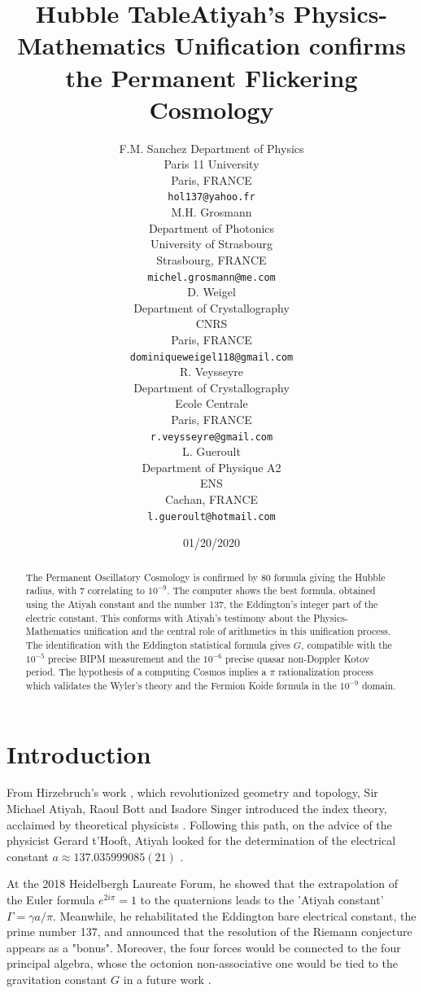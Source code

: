 \documentclass[a4paper,9pt]{article}
\title{Hubble Table}
\date{01/20/2020}
\title{Atiyah's Physics-Mathematics Unification confirms the Permanent Flickering Cosmology}
\author{
  F.M. Sanchez
  Department of Physics\\
  Paris 11 University\\
  Paris, FRANCE \\
  \texttt{hol137@yahoo.fr} \\
   \And
 M.H. Grosmann \\
  Department of Photonics\\
  University of Strasbourg\\
  Strasbourg, FRANCE \\
  \texttt{michel.grosmann@me.com} \\
   \And
 D. Weigel \\
  Department of Crystallography\\
  CNRS\\
  Paris, FRANCE \\
  \texttt{dominiqueweigel118@gmail.com} \\
   \And
 R. Veysseyre \\
  Department of Crystallography\\
  Ecole Centrale\\
  Paris, FRANCE \\
  \texttt{r.veysseyre@gmail.com} \\
   \And
 L. Gueroult\\
  Department of Physique A2 \\ 
  ENS \\
  Cachan, FRANCE \\
  \texttt{l.gueroult@hotmail.com} \\ 
}
\begin{document}
\maketitle

\begin{abstract}
The Permanent Oscillatory Cosmology is confirmed by 80 formula giving the Hubble radius, with 7 correlating to $10^{-9}$. The computer shows the best formula, obtained using the Atiyah constant and the number 137, the Eddington's integer part of the electric constant. This conforms with Atiyah's testimony about the Physics-Mathematics unification and the central role of arithmetics in this unification process. The identification with the Eddington statistical formula gives $G$, compatible with the $10^{-5}$ precise BIPM measurement and the $10^{-6}$ precise quasar non-Doppler Kotov period. The hypothesis of a computing Cosmos implies a $\pi$ rationalization process which validates the Wyler's theory and the Fermion Koide formula in the $10^{-9}$ domain.   

\end{abstract}





\label{sec:headings}

\section{Introduction}
  
    From Hirzebruch's work \cite{Hirzebruch}, which revolutionized geometry and topology, Sir Michael Atiyah, Raoul Bott \cite{Bott} and Isadore Singer \cite{Singer} introduced the index theory, acclaimed by theoretical physicists \cite{Alvarez}. Following this path, on the advice of the physicist Gerard t'Hooft, Atiyah looked for the determination of the electrical constant $a \approx 137.035999085(21)$ \cite{Atiyah}.
    
    
    At the 2018 Heidelbergh Laureate Forum, he showed that the extrapolation of the Euler formula  $e^{2i\pi} = 1$ to the quaternions leads to the 'Atiyah constant' $\Gamma = \gamma a/\pi $. Meanwhile, he rehabilitated the Eddington \cite{Eddington} bare electrical constant, the prime number 137, and announced that the resolution of the Riemann conjecture appears as a "bonus". Moreover, the four forces would be connected to the four principal algebra, whose the octonion non-associative one would be tied to the gravitation constant $G$ in a future work \cite{Atiyah}. 
       
\end{document}
